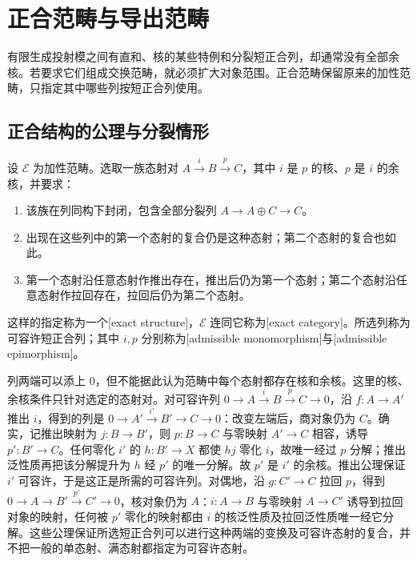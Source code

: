 
\section{正合范畴与导出范畴}
\label{b4:sec:B01}

有限生成投射模之间有直和、核的某些特例和分裂短正合列，却通常没有全部余核。若要求它们组成交换范畴，就必须扩大对象范围。正合范畴保留原来的加性范畴，只指定其中哪些列按短正合列使用。

\subsection{正合结构的公理与分裂情形}
\label{b4:subsec:B01:01}

\begin{definition}\label{b4:def:B-exact-category}
	设 \(\mathcal E\) 为加性范畴。选取一族态射对 \(A\xrightarrow{i}B\xrightarrow{p}C\)，其中 \(i\) 是 \(p\) 的核、\(p\) 是 \(i\) 的余核，并要求：
	\begin{enumerate}
		\item 该族在列同构下封闭，包含全部分裂列 \(A\rightarrow A\oplus C\rightarrow C\)。
		\item 出现在这些列中的第一个态射的复合仍是这种态射；第二个态射的复合也如此。
		\item 第一个态射沿任意态射作推出存在，推出后仍为第一个态射；第二个态射沿任意态射作拉回存在，拉回后仍为第二个态射。
	\end{enumerate}
	这样的指定称为一个[exact structure]，\(\mathcal E\) 连同它称为[exact category]。所选列称为可容许短正合列；其中 \(i,p\) 分别称为[admissible monomorphism]与[admissible epimorphism]。
\end{definition}

列两端可以添上 \(0\)，但不能据此认为范畴中每个态射都存在核和余核。这里的核、余核条件只针对选定的态射对。对可容许列 \(0\to A\xrightarrow{i}B\xrightarrow{p}C\to0\)，沿 \(f:A\to A'\) 推出 \(i\)，得到的列是 \(0\to A'\xrightarrow{i'}B'\to C\to0\)：改变左端后，商对象仍为 \(C\)。确实，记推出映射为 \(j:B\to B'\)，则 \(p:B\to C\) 与零映射 \(A'\to C\) 相容，诱导 \(p':B'\to C\)。任何零化 \(i'\) 的 \(h:B'\to X\) 都使 \(hj\) 零化 \(i\)，故唯一经过 \(p\) 分解；推出泛性质再把该分解提升为 \(h\) 经 \(p'\) 的唯一分解。故 \(p'\) 是 \(i'\) 的余核。推出公理保证 \(i'\) 可容许，于是这正是所需的可容许列。对偶地，沿 \(g:C'\to C\) 拉回 \(p\)，得到 \(0\to A\to B'\xrightarrow{p'}C'\to0\)，核对象仍为 \(A\)：\(i:A\to B\) 与零映射 \(A\to C'\) 诱导到拉回对象的映射，任何被 \(p'\) 零化的映射都由 \(i\) 的核泛性质及拉回泛性质唯一经它分解。这些公理保证所选短正合列可以进行这种两端的变换及可容许态射的复合，并不把一般的单态射、满态射都指定为可容许态射。

